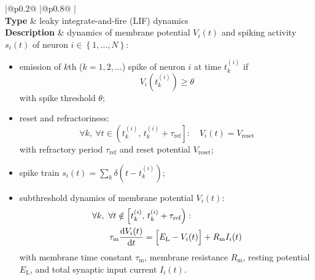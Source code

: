 \documentclass[a4paper, 12pt, twoside, openright]{book}
\newcommand{\diff}{\ensuremath{\text{d}}}
\newcommand{\RM}{R_\text{m}}
\newcommand{\tauM}{\tau_\text{m}}
\newcommand{\tauR}{\tau_\text{ref}}
\def\marg{2pt}
\begin{document}
\begin{table}[H]
\begin{tabular}{
  |@{\hspace*{\marg}}p{}@{\hspace*{\marg}}
  |@{\hspace*{\marg}}p{}@{\hspace*{\marg}}
  |}
  \hline 
  \\
  \hline 
  \textbf{Type} & leaky integrate-and-fire (LIF) dynamics\\
  \hline 
  \textbf{Description} & dynamics of membrane potential $V_{i}(t)$ and spiking activity $s_i(t)$ of neuron $i\in\left\{1,\ldots,N\right\} $:
                         \begin{itemize}
                         \item emission of $k$th ($k=1,2,\ldots$) spike of neuron $i$ at time $t_{k}^{(i)}$ if
                           \begin{equation*}
                             V_{i}\left(t_{k}^{(i)}\right)\geq\theta  
                           \end{equation*}
                           with spike threshold $\theta$;
                         \item reset and refractoriness:
                           \begin{equation*}
                             \forall{}k,\ \forall t \in \left(t_{k}^{(i)},\,t_{k}^{(i)}+\tauR\right]:\quad V_{i}(t)=V_\text{reset}  
                           \end{equation*}
                            with refractory period $\tauR$ and reset potential $V_\text{reset}$;
                         \item spike train $\displaystyle s_i(t)=\sum_k \delta(t-t_k^{(i)})$;
                         \item subthreshold dynamics of membrane potential $V_{i}(t)$:
                           \begin{equation*}
                             \begin{aligned}
                               &\forall{}k,\ \forall t \notin \left[t_{k}^{(i)},\,t_{k}^{(i)}+\tauR\right):\\
                               &\qquad\tauM\frac{\diff{}V_i(t)}{\diff{}t} =
                               \Bigl[E_\text{L}-V_i(t)\Bigr]+\RM I_i(t)
                             \end{aligned}
                           \end{equation*}
                           with membrane time constant $\tauM$, membrane resistance $\RM$, resting potential $E_\text{L}$, and total synaptic input current $I_i(t)$.
                         \end{itemize}\\
  \hline 
\end{tabular}
\caption{Description of the network model (continues on next page).}
\end{table}
\end{document}

